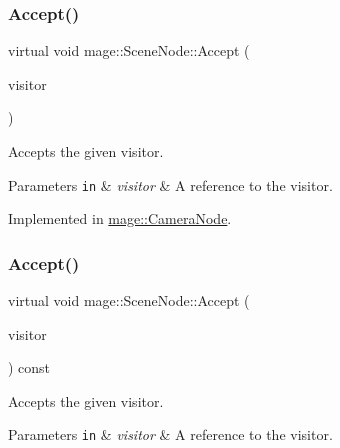 \subsubsection{\texorpdfstring{Accept()}{Accept()}\hspace{0.1cm}{\footnotesize\ttfamily [1/2]}}
{\footnotesize\ttfamily virtual void mage\+::\+Scene\+Node\+::\+Accept (\begin{DoxyParamCaption}\item[{\hyperlink{classmage_1_1_scene_node_visitor}{Scene\+Node\+Visitor} \&}]{visitor }\end{DoxyParamCaption})\hspace{0.3cm}{\ttfamily [pure virtual]}}

Accepts the given visitor.


\begin{DoxyParams}[1]{Parameters}
\mbox{\tt in}  & {\em visitor} & A reference to the visitor. \\
\hline
\end{DoxyParams}


Implemented in \hyperlink{classmage_1_1_camera_node_aed9c3c12cc4163fed880c49e43380efe}{mage\+::\+Camera\+Node}.

\hypertarget{classmage_1_1_scene_node_a35fbfd49185fb61cb4e9edf56af35262}{}\label{classmage_1_1_scene_node_a35fbfd49185fb61cb4e9edf56af35262} 
\subsubsection{\texorpdfstring{Accept()}{Accept()}\hspace{0.1cm}{\footnotesize\ttfamily [2/2]}}
{\footnotesize\ttfamily virtual void mage\+::\+Scene\+Node\+::\+Accept (\begin{DoxyParamCaption}\item[{\hyperlink{classmage_1_1_scene_node_visitor}{Scene\+Node\+Visitor} \&}]{visitor }\end{DoxyParamCaption}) const\hspace{0.3cm}{\ttfamily [pure virtual]}}

Accepts the given visitor.


\begin{DoxyParams}[1]{Parameters}
\mbox{\tt in}  & {\em visitor} & A reference to the visitor. \\
\hline
\end{DoxyParams}


